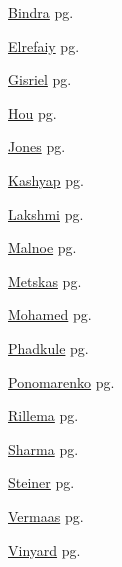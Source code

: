 \item \hyperlink{Bindra.1}{Bindra} pg. \pageref{abs:Bindra}
\item \hyperlink{Elrefaiy.1}{Elrefaiy} pg. \pageref{abs:Elrefaiy}
\item \hyperlink{Gisriel.1}{Gisriel} pg. \pageref{abs:Gisriel}
\item \hyperlink{Hou.1}{Hou} pg. \pageref{abs:Hou}
\item \hyperlink{Jones.1}{Jones} pg. \pageref{abs:Jones}
\item \hyperlink{Kashyap.1}{Kashyap} pg. \pageref{abs:Kashyap}
\item \hyperlink{Lakshmi.1}{Lakshmi} pg. \pageref{abs:Lakshmi}
\item \hyperlink{Malnoe.1}{Malnoe} pg. \pageref{abs:Malnoe}
\item \hyperlink{Metskas.1}{Metskas} pg. \pageref{abs:Metskas}
\item \hyperlink{Mohamed.1}{Mohamed} pg. \pageref{abs:Mohamed}
\item \hyperlink{Phadkule.1}{Phadkule} pg. \pageref{abs:Phadkule}
\item \hyperlink{Ponomarenko.1}{Ponomarenko} pg. \pageref{abs:Ponomarenko}
\item \hyperlink{Rillema.1}{Rillema} pg. \pageref{abs:Rillema}
\item \hyperlink{Sharma.1}{Sharma} pg. \pageref{abs:Sharma}
\item \hyperlink{Steiner.1}{Steiner} pg. \pageref{abs:Steiner}
\item \hyperlink{Vermaas.1}{Vermaas} pg. \pageref{abs:Vermaas}
\item \hyperlink{Vinyard.1}{Vinyard} pg. \pageref{abs:Vinyard}
